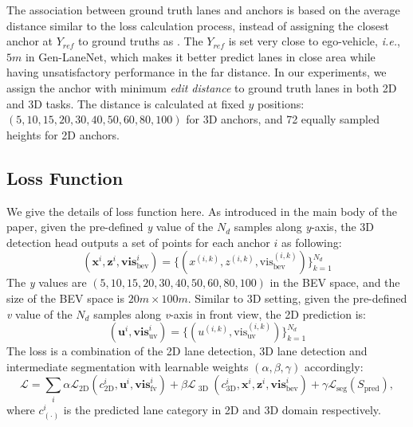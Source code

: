 \documentclass[runningheads]{llncs}
\begin{document}
The association between ground truth lanes and anchors is based on the average distance similar to the loss calculation process, instead of assigning the closest anchor at $Y_{ref}$ to ground truths as \cite{Garnett_2019_ICCV,guo2020gen}.
The $Y_{ref}$ is set very close to ego-vehicle, \textit{i.e.}, $5m$ in Gen-LaneNet, which makes it better predict lanes in close area while having unsatisfactory performance in the far distance.
In our experiments, we assign the anchor with minimum \textit{edit distance} to ground truth lanes in both 2D and 3D tasks.
The distance is calculated at fixed $y$ positions: $(5, 10, 15, 20, 30, 40, 50, 60, 80, 100)$ for 3D anchors, and 72 equally sampled heights for 2D anchors.




\subsection{Loss Function}
We give the details of loss function here.
As introduced in the main body of the paper, given the pre-defined \textit{y} value of the $N_d$ samples along \textit{y}-axis, the 3D detection head outputs a set of points for each anchor $i$ as following:
\begin{equation}
    (\mathbf{x}^i, \mathbf{z}^i, \mathbf{vis}^i_{\text{bev}}) = \{ (x^{(i,k)}, z^{(i,k)}, \text{vis}^{(i,k)}_{\text{bev}} ) \}^{N_d}_{k=1}
\end{equation}
The \textit{y} values are $(5, 10, 15, 20, 30, 40, 50, 60, 80, 100)$ in the BEV space, and the size of the BEV space is $20m \times 100m$.
Similar to 3D setting, given the pre-defined \textit{v} value of the $N_d$ samples along \textit{v}-axis in front view, the 2D prediction is:
\begin{equation}
    (\mathbf{u}^i, \mathbf{vis}^i_{\text{uv}}) = \{ (u^{(i,k)}, \text{vis}^{(i,k)}_{\text{uv}} ) \}^{N_d}_{k=1}
\end{equation}
The loss is a combination of the 2D lane detection, 3D lane detection and intermediate segmentation with learnable weights $(\alpha, \beta, \gamma)$ accordingly:
\begin{equation}
\mathcal{L} = 
        \sum_i  
        \alpha \mathcal{L}_{ \text{2D}  }( c^i_{  \text{2D}   }, \mathbf{u}^i, \mathbf{vis}^i_{\text{fv}} ) + \beta 
        \mathcal{L}_{ \text{  3D } } ( c^i_{ \text{3D} }, \mathbf{x}^i, \mathbf{z}^i, \mathbf{vis}^i_{\text{bev}} ) + \gamma \mathcal{L}_{ \text{seg}} (S_{\text{pred}}),
\end{equation}
where $c^i_{( \cdot )} $ is the predicted lane category in 2D and 3D domain respectively.
\end{document}
